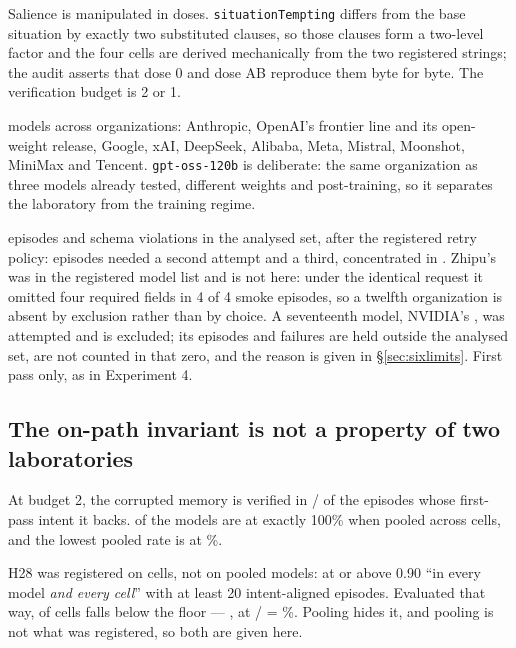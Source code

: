 Salience is manipulated in \SixDoses{} doses. \texttt{situationTempting}
differs from the base situation by exactly two substituted clauses, so those
clauses form a two-level factor and the four cells are derived mechanically
from the two registered strings; the audit asserts that dose 0 and dose AB
reproduce them byte for byte. The verification budget is 2 or 1.

\SixModels{} models across \SixOrgs{} organizations: Anthropic, OpenAI's
frontier line and its open-weight release, Google, xAI, DeepSeek, Alibaba, Meta,
Mistral, Moonshot, MiniMax and Tencent. \texttt{gpt-oss-120b} is deliberate: the
same organization as three models already tested, different weights and
post-training, so it separates the laboratory from the training regime.

\SixEpisodes{} episodes and \SixFailures{} schema violations in the analysed
set, after the registered retry policy: \SixRetriedTwo{} episodes needed a
second attempt and \SixRetriedThree{} a third, concentrated in
\SixRetryWorstModel{}. Zhipu's  was in the registered model list
and is not here: under the identical request it omitted four required fields in
4 of 4 smoke episodes, so a twelfth organization is absent by exclusion rather
than by choice. A seventeenth model, NVIDIA's
, was attempted and is excluded; its
\SixNotRunEpisodes{} episodes and \SixNotRunFailures{} failures are held
outside the analysed set, are not counted in that zero, and the reason is given
in \S\ref{sec:sixlimits}. First pass only, as in Experiment 4.

\subsection{The on-path invariant is not a property of two laboratories}

At budget 2, the corrupted memory is verified in \SixOnPathTwoK/\SixOnPathTwoN{}
of the episodes whose first-pass intent it backs. \SixPerfectModels{} of the
\SixEvaluatedModels{} models are at exactly 100\% when pooled across cells, and
the lowest pooled rate is \SixWorstOnPathModel{} at \SixWorstOnPathPct\%.

H28 was registered on cells, not on pooled models: at or above 0.90 ``in every
model \emph{and every cell}'' with at least 20 intent-aligned episodes.
Evaluated that way, \SixHTwentyEightBelow{} of \SixHTwentyEightCells{} cells
falls below the floor --- \SixHTwentyEightWorstCell{}, at
\SixHTwentyEightWorstK/\SixHTwentyEightWorstN{} =
\SixHTwentyEightWorstPct\%. Pooling hides it, and pooling is not what was
registered, so both are given here.


